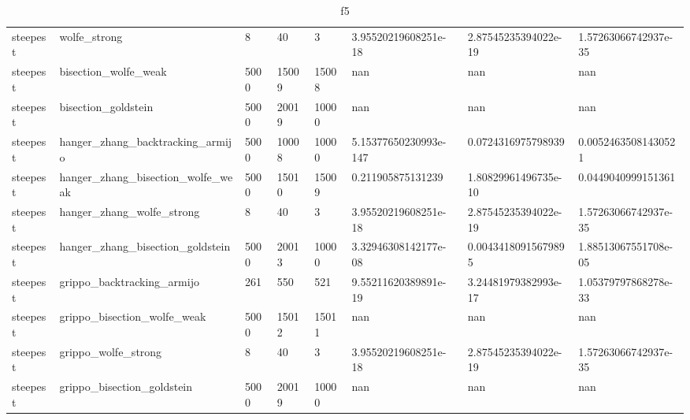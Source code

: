 \documentclass[a4paper,11pt]{article}
\numberwithin{equation}{section} %
\begin{document}
\begin{table}[h!]
{\begin{tabular}{|l|l|l|l|l|l|l|l|}
        steepest & wolfe\_strong & 8 & 40 & 3 & 3.95520219608251e-18 & 2.87545235394022e-19 & 1.57263066742937e-35 \\
        steepest & bisection\_wolfe\_weak & 5000 & 15009 & 15008 & nan & nan & nan \\
        steepest & bisection\_goldstein & 5000 & 20019 & 10000 & nan & nan & nan \\
        steepest & hanger\_zhang\_backtracking\_armijo & 5000 & 10008 & 10000 & 5.15377650230993e-147 & 0.0724316975798939 & 0.00524635081430521 \\
        steepest & hanger\_zhang\_bisection\_wolfe\_weak & 5000 & 15010 & 15009 & 0.211905875131239 & 1.80829961496735e-10 & 0.0449040999151361 \\
        steepest & hanger\_zhang\_wolfe\_strong & 8 & 40 & 3 & 3.95520219608251e-18 & 2.87545235394022e-19 & 1.57263066742937e-35 \\
        steepest & hanger\_zhang\_bisection\_goldstein & 5000 & 20013 & 10000 & 3.32946308142177e-08 & 0.00434180915679895 & 1.88513067551708e-05 \\
        steepest & grippo\_backtracking\_armijo & 261 & 550 & 521 & 9.55211620389891e-19 & 3.24481979382993e-17 & 1.05379797868278e-33 \\
        steepest & grippo\_bisection\_wolfe\_weak & 5000 & 15012 & 15011 & nan & nan & nan \\
        steepest & grippo\_wolfe\_strong & 8 & 40 & 3 & 3.95520219608251e-18 & 2.87545235394022e-19 & 1.57263066742937e-35 \\
        steepest & grippo\_bisection\_goldstein & 5000 & 20019 & 10000 & nan & nan & nan \\
\end{tabular}}
\caption{f5}
\label{table:f5}
\end{table}
\end{document}
